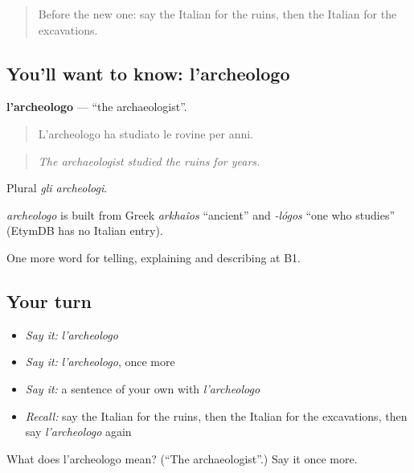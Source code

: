 \label{lesson:IT-C330-archeologo}



\begin{quote}
Before the new one: say the Italian for the ruins, then the Italian for the excavations.
\end{quote}

\subsection*{You'll want to know: l'archeologo}
\textbf{l'archeologo} — \textquotedblleft{}the archaeologist\textquotedblright{}.

\begin{quote}
L'archeologo ha studiato le rovine per anni.
\end{quote}

\begin{quote}
\emph{The archaeologist studied the ruins for years.}
\end{quote}

Plural \emph{gli archeologi}.

\begin{cousinweb}
\emph{archeologo} is built from Greek \emph{arkhaîos} \textquotedblleft{}ancient\textquotedblright{} and \emph{-lógos} \textquotedblleft{}one who studies\textquotedblright{} (EtymDB has no Italian entry).
\end{cousinweb}

\begin{grammarlens}[title={What you've built}]
One more word for telling, explaining and describing at B1.
\end{grammarlens}

\subsection*{Your turn}
\begin{itemize}
\raggedright
  \item \emph{Say it:} \emph{l'archeologo}
  \item \emph{Say it:} \emph{l'archeologo}, once more
  \item \emph{Say it:} a sentence of your own with \emph{l'archeologo}
  \item \emph{Recall:} say the Italian for the ruins, then the Italian for the excavations, then say \emph{l'archeologo} again
\end{itemize}

\begin{tcolorbox}[breakable,colback=teal!4,colframe=teal!35!black,title={Before you move on}]
What does l'archeologo mean? (\textquotedblleft{}The archaeologist\textquotedblright{}.) Say it once more.
\end{tcolorbox}
